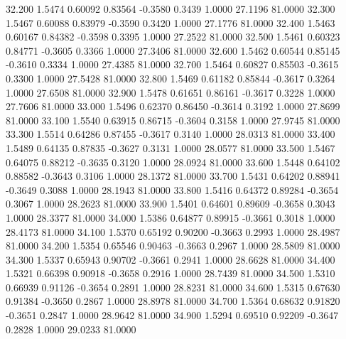   32.200   1.5474   0.60092   0.83564  -0.3580   0.3439   1.0000  27.1196  81.0000
  32.300   1.5467   0.60088   0.83979  -0.3590   0.3420   1.0000  27.1776  81.0000
  32.400   1.5463   0.60167   0.84382  -0.3598   0.3395   1.0000  27.2522  81.0000
  32.500   1.5461   0.60323   0.84771  -0.3605   0.3366   1.0000  27.3406  81.0000
  32.600   1.5462   0.60544   0.85145  -0.3610   0.3334   1.0000  27.4385  81.0000
  32.700   1.5464   0.60827   0.85503  -0.3615   0.3300   1.0000  27.5428  81.0000
  32.800   1.5469   0.61182   0.85844  -0.3617   0.3264   1.0000  27.6508  81.0000
  32.900   1.5478   0.61651   0.86161  -0.3617   0.3228   1.0000  27.7606  81.0000
  33.000   1.5496   0.62370   0.86450  -0.3614   0.3192   1.0000  27.8699  81.0000
  33.100   1.5540   0.63915   0.86715  -0.3604   0.3158   1.0000  27.9745  81.0000
  33.300   1.5514   0.64286   0.87455  -0.3617   0.3140   1.0000  28.0313  81.0000
  33.400   1.5489   0.64135   0.87835  -0.3627   0.3131   1.0000  28.0577  81.0000
  33.500   1.5467   0.64075   0.88212  -0.3635   0.3120   1.0000  28.0924  81.0000
  33.600   1.5448   0.64102   0.88582  -0.3643   0.3106   1.0000  28.1372  81.0000
  33.700   1.5431   0.64202   0.88941  -0.3649   0.3088   1.0000  28.1943  81.0000
  33.800   1.5416   0.64372   0.89284  -0.3654   0.3067   1.0000  28.2623  81.0000
  33.900   1.5401   0.64601   0.89609  -0.3658   0.3043   1.0000  28.3377  81.0000
  34.000   1.5386   0.64877   0.89915  -0.3661   0.3018   1.0000  28.4173  81.0000
  34.100   1.5370   0.65192   0.90200  -0.3663   0.2993   1.0000  28.4987  81.0000
  34.200   1.5354   0.65546   0.90463  -0.3663   0.2967   1.0000  28.5809  81.0000
  34.300   1.5337   0.65943   0.90702  -0.3661   0.2941   1.0000  28.6628  81.0000
  34.400   1.5321   0.66398   0.90918  -0.3658   0.2916   1.0000  28.7439  81.0000
  34.500   1.5310   0.66939   0.91126  -0.3654   0.2891   1.0000  28.8231  81.0000
  34.600   1.5315   0.67630   0.91384  -0.3650   0.2867   1.0000  28.8978  81.0000
  34.700   1.5364   0.68632   0.91820  -0.3651   0.2847   1.0000  28.9642  81.0000
  34.900   1.5294   0.69510   0.92209  -0.3647   0.2828   1.0000  29.0233  81.0000
